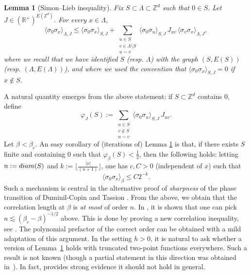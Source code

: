 \documentclass[10pt,a4paper]{amsart}
\numberwithin{equation}{section}
\newtheorem{Lem}[Thm]{Lemma}
\begin{document}
\begin{Lem}[Simon--Lieb inequality]\label{lem:SL} Fix $S\subset \Lambda\subset \mathbb Z^d$ such that $0\in S$. Let $J\in (\mathbb R^+)^{E(\mathbb Z^d)}$. For every $x\in \Lambda$,
\begin{equation}
	\langle \sigma_0\sigma_x\rangle_{\Lambda,J}\leq  \langle \sigma_0\sigma_x\rangle_{S,J}+\sum_{\substack{u\in S\\ v\in \Lambda\setminus S\\u\sim v}}\langle \sigma_0\sigma_u\rangle_{S,J}\,J_{uv} \,\langle \sigma_v\sigma_x\rangle_{\Lambda,J},
\end{equation}
where we recall that we have identified $S$ (resp. $\Lambda$) with the graph $(S,E(S))$ (resp. $(\Lambda,E(\Lambda))$), and where we used the convention that $\langle \sigma_0\sigma_x\rangle_{S,J}=0$ if $x\notin S$.
\end{Lem}
A natural quantity emerges from the above statement: if $S\subset \mathbb Z^d$ contains $0$, define
\begin{equation}\label{eq: def phi}
	\varphi_J(S):= \sum_{\substack{u\in S\\ v\notin S\\u\sim v}}\langle \sigma_0\sigma_u\rangle_{S,J}\,J_{uv}.
\end{equation}
Let $\beta<\beta_c$. An easy corollary of (iterations of) Lemma \ref{lem:SL} is that, if there exists $S$ finite and containing $0$ such that $\varphi_\beta(S)< \tfrac{1}{2}$, then the following holds: letting $n:=\textup{diam}(S)$ and $k:=\lfloor \tfrac{|x|}{(n+1)}\rfloor$, one has $c,C>0$ (independent of $x$) such that 
\begin{equation}
	\langle \sigma_0\sigma_x\rangle_{\beta}\leq C2^{-k}.
\end{equation}
Such a mechanism is central in the alternative proof of \emph{sharpness} of the phase transition of Duminil-Copin and Tassion \cite{DuminilTassionNewProofSharpness2016}. From the above, we obtain that the correlation length at $\beta$ is \emph{at most} of order $n$. In \cite{DuminilPanis2024newLB}, it is shown that one can pick $n\lesssim (\beta_c-\beta)^{-1/2}$ above. This is done by proving a new correlation inequality, see \cite[Theorem~1.2]{DuminilPanis2024newLB}. The polynomial prefactor of the correct order can be obtained with a mild adaptation of this argument. In the setting $h>0$, it is natural to ask whether a version of Lemma~\ref{lem:SL} holds with truncated two-point functions everywhere. Such a result is not known (though a partial statement 
in this direction was obtained in~\cite{graham1982correlation}). In fact, 
\cite{BakerBessis1981} provides strong evidence it should not hold in general.
\end{document}
